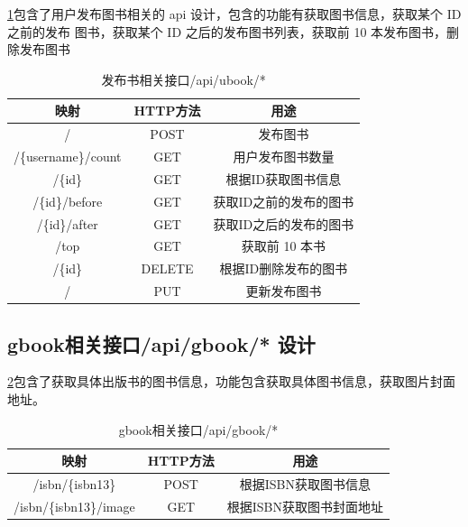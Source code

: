\cref{api_ubook}包含了用户发布图书相关的 api 设计，包含的功能有获取图书信息，获取某个 ID 之前的发布
图书，获取某个 ID 之后的发布图书列表，获取前 10 本发布图书，删除发布图书

\begin{table}[h]
	\centering
	\caption{发布书相关接口/api/ubook/*}
	\label{api_ubook}
	\begin{tabular}{ccc}
		\toprule
		\textbf{映射} & \textbf{HTTP方法} & \textbf{用途} \\
		\midrule
		/ & POST & 发布图书 \\
		/\{username\}/count & GET & 用户发布图书数量 \\
		/\{id\} & GET & 根据ID获取图书信息 \\
		/\{id\}/before & GET & 获取ID之前的发布的图书 \\ 
		/\{id\}/after & GET & 获取ID之后的发布的图书 \\
		/top & GET & 获取前 10 本书 \\
		/\{id\} & DELETE & 根据ID删除发布的图书 \\
		/ & PUT & 更新发布图书 \\
			\bottomrule
	\end{tabular}
\end{table}

\subsection{gbook相关接口/api/gbook/* 设计}

\cref{api_gbook}包含了获取具体出版书的图书信息，功能包含获取具体图书信息，获取图片封面地址。

\begin{table}[h]
	\centering
	\caption{gbook相关接口/api/gbook/*}
	\label{api_gbook}
	\begin{tabular}{ccc}
		\toprule
		\textbf{映射} & \textbf{HTTP方法} & \textbf{用途} \\
		\midrule
		/isbn/\{isbn13\} & POST & 根据ISBN获取图书信息 \\
		/isbn/\{isbn13\}/image & GET & 根据ISBN获取图书封面地址 \\
			\bottomrule
	\end{tabular}
\end{table}




